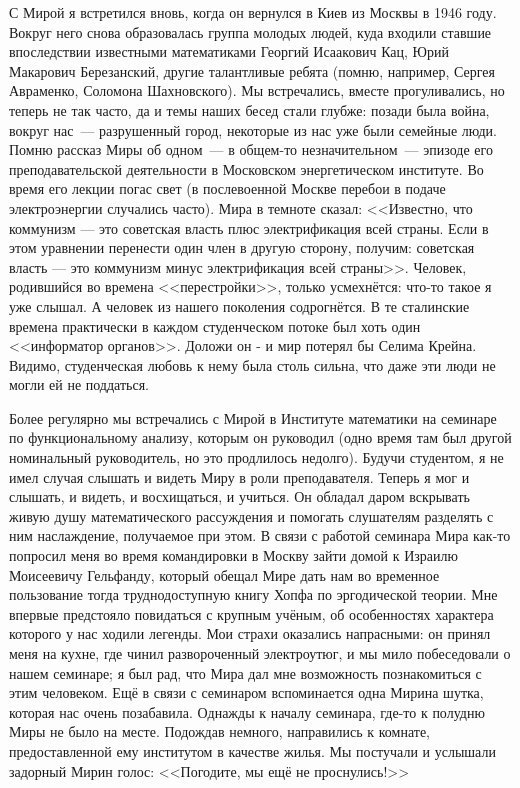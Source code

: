 С Мирой я встретился вновь, когда он вернулся в Киев из Москвы в 1946 году.
Вокруг него снова образовалась группа молодых людей,
куда входили ставшие впоследствии известными математиками Георгий Исаакович Кац, Юрий Макарович Березанский,
другие талантливые ребята (помню, например, Сергея Авраменко, Соломона Шахновского).
Мы встречались, вместе прогуливались, но теперь не так часто, да и темы наших бесед стали глубже:
позади была война, вокруг нас~--- разрушенный город, некоторые из нас уже были семейные люди.
Помню рассказ Миры об одном~--- в общем-то незначительном~--- эпизоде его преподавательской деятельности в Московском энергетическом институте. Во время его лекции погас свет (в послевоенной Москве перебои в подаче электроэнергии случались часто). Мира в темноте сказал: <<Известно, что коммунизм --- это советская власть плюс электрификация всей страны. Если в этом уравнении перенести один член в другую сторону, получим: советская власть --- это коммунизм минус электрификация всей страны>>. Человек, родившийся во времена <<перестройки>>, только усмехнётся: что-то такое я уже слышал. А человек из нашего поколения содрогнётся. В те сталинские времена практически в каждом студенческом потоке был хоть один <<информатор органов>>. Доложи он - и мир потерял бы Селима Крейна. Видимо, студенческая любовь к нему была столь сильна, что даже эти люди не могли ей не поддаться.

Более регулярно мы встречались с Мирой в Институте математики на семинаре по функциональному анализу, которым он руководил (одно время там был другой номинальный руководитель, но это продлилось недолго). Будучи студентом, я не имел случая слышать и видеть Миру в роли преподавателя. Теперь я мог и слышать, и видеть, и восхищаться, и учиться. Он обладал даром вскрывать живую душу математического рассуждения и помогать слушателям разделять с ним наслаждение, получаемое при этом. В связи с работой семинара Мира как-то попросил меня во время командировки в Москву зайти домой к Израилю Моисеевичу Гельфанду, который обещал Мире дать нам во временное пользование тогда труднодоступную книгу Хопфа по эргодической теории. Мне впервые предстояло повидаться с крупным учёным, об особенностях характера которого у нас ходили легенды. Мои страхи оказались напрасными: он принял меня на кухне, где чинил развороченный электроутюг, и мы мило побеседовали о нашем семинаре; я был рад, что Мира дал мне возможность познакомиться с этим человеком. Ещё в связи с семинаром вспоминается одна Мирина шутка, которая нас очень позабавила. Однажды к началу семинара, где-то к полудню Миры не было на месте. Подождав немного, направились к комнате, предоставленной ему институтом в качестве жилья. Мы постучали и услышали задорный Мирин голос: <<Погодите, мы ещё не проснулись!>>

